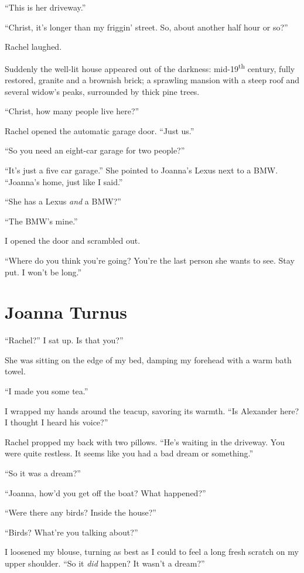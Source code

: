 ``This is her driveway.''

``Christ, it's longer than my friggin' street. So, about another half
hour or so?''

Rachel laughed.

Suddenly the well-lit house appeared out of the darkness:
mid-19\textsuperscript{th} century, fully restored, granite and a
brownish brick; a sprawling mansion with a steep roof and several
widow's peaks, surrounded by thick pine trees.

``Christ, how many people live here?''

Rachel opened the automatic garage door. ``Just us.''

``So you need an eight-car garage for two people?''

``It's just a five car garage.'' She pointed to Joanna's Lexus next to a
BMW. ``Joanna's home, just like I said.''

``She has a Lexus \emph{and} a BMW?''

``The BMW's mine.''

I opened the door and scrambled out.

``Where do you think you're going? You're the last person she wants to
see. Stay put. I won't be long.''

\chapter{Joanna Turnus}

\titlemark

``Rachel?'' I sat up. Is that you?''

She was sitting on the edge of my bed, damping my forehead with a warm
bath towel.

``I made you some tea.''

I wrapped my hands around the teacup, savoring its warmth. ``Is
Alexander here? I thought I heard his voice?''

Rachel propped my back with two pillows. ``He's waiting in the driveway.
You were quite restless. It seems like you had a bad dream or
something.''

``So it was a dream?''

``Joanna, how'd you get off the boat? What happened?''

``Were there any birds? Inside the house?''

``Birds? What're you talking about?''

I loosened my blouse, turning as best as I could to feel a long fresh
scratch on my upper shoulder. ``So it \emph{did} happen? It wasn't a
dream?''

